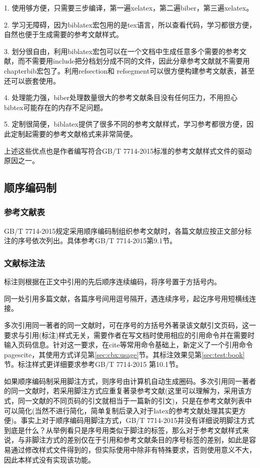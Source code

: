 1. 使用够方便，只需要三步编译，第一遍xelatex，第二遍biber，第三遍xelatex。

2. 学习无障碍，因为biblatex宏包用的是tex语言，所以查看代码，学习都很方便，自然也便于生成需要的参考文献样式。

3. 划分很自由，利用biblatex宏包可以在一个文档中生成任意多个需要的参考文献，而不需要用include把分档划分成不同的文件，因此分章参考文献就不需要用chapterbib宏包了。利用refsection和 refsegment可以很方便构建参考文献表，甚至还可以嵌套使用。

4. 处理能力强，biber处理数量很大的参考文献条目没有任何压力，不用担心bibtex可能存在的内存不足问题。

5. 定制很简便，biblatex提供了很多不同的参考文献样式，学习参考都很方便，因此定制起需要的参考文献格式来非常简便。

上述这些优点也是作者编写符合GB/T 7714-2015标准的参考文献样式文件的驱动原因之一。

\subsection{顺序编码制}

\subsubsection{参考文献表}

GB/T 7714-2015规定采用顺序编码制组织参考文献时，各篇文献应按正文部分标注的序号依次列出。具体参考GB/T 7714-2015第9.1节。

\subsubsection{文献标注法}
标注则根据在正文中引用的先后顺序连续编码，将序号置于方括号内。

同一处引用多篇文献，各篇序号间用逗号隔开，遇连续序号，起讫序号用短横线连接。

多次引用同一著者的同一文献时，可在序号的方括号外著录该文献引文页码，这一要求与引用(标注)样式无关，需要作者在写文档时使用相应的引用命令并在需要时输入页码信息。针对这一要求，在cite等常用命令基础上，新定义了一个引用命令pagescite，其使用方式详见第\ref{sec:cbx:usage}节。其标注效果见第\ref{sec:test:book}节。标注样式更详细要求参考GB/T 7714-2015 第10.1节。

如果顺序编码制采用脚注方式，则序号由计算机自动生成圈码。多次引用同一著者的同一文献时，若采用脚注方式应重复著录参考文献(这里可以理解为，采用该方式，同一文献的不同页码的引文就相当于一篇新的引文)，只是在参考文献列表中可以简化(当然不进行简化，简单复制后录入对于latex的参考文献处理其实更方便)。事实上对于顺序编码用脚注方式，GB/T 7714-2015并没有详细说明脚注方式到底是什么？从举例看只是序号用类似于脚注的标签，那么对于参考文献样式来说，与非脚注方式的差别仅在于引用和参考文献条目的序号标签的差别，如此是容易通过修改样式文件得到的，但实际使用中除非有特殊要求，否则使用意义不大，因此本样式没有实现该功能。

